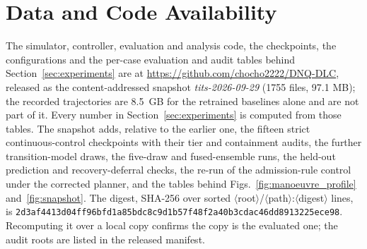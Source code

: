 \documentclass[journal]{IEEEtran}
\begin{document}
\section*{Data and Code Availability}
The simulator, controller, evaluation and analysis code, the checkpoints, the
configurations and the per-case evaluation and audit tables behind
Section~\ref{sec:experiments} are at
\url{https://github.com/chocho2222/DNQ-DLC}, released as the content-addressed
snapshot \emph{tits-2026-09-29} (1755 files, 97.1 MB); the recorded trajectories
are 8.5~GB for the retrained baselines alone and are not part of it. Every number
in Section~\ref{sec:experiments} is computed from those tables. The snapshot
adds, relative to the earlier one, the fifteen strict continuous-control
checkpoints with their tier and containment audits, the further
transition-model draws, the five-draw and fused-ensemble runs, the held-out
prediction and recovery-deferral checks, the re-run of the admission-rule
control under the corrected planner, and the tables behind
Figs.~\ref{fig:manoeuvre_profile} and~\ref{fig:snapshot}. The digest, SHA-256 over sorted
$\langle$root$\rangle$/$\langle$path$\rangle$:$\langle$digest$\rangle$ lines, is
\texttt{2d3af4413d04ff96bfd1a85bdc8c9d1b}\newline\texttt{57f48f2a40b3cdac46dd8913225ece98}.
Recomputing it over a local copy confirms the copy is the evaluated one; the
audit roots are listed in the released manifest.




\end{document}

